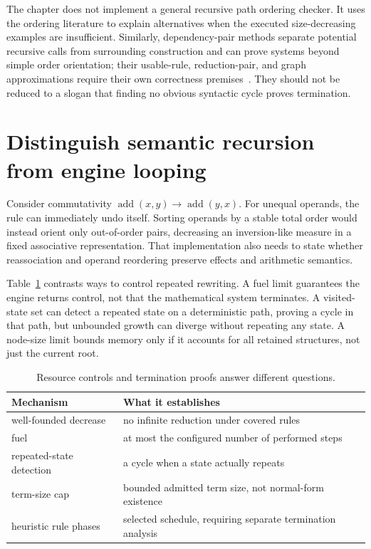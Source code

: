 The chapter does not implement a general recursive path ordering checker.
It uses the ordering literature to explain alternatives when the executed size-decreasing examples are insufficient.
Similarly, dependency-pair methods separate potential recursive calls from surrounding construction and can prove systems beyond simple order orientation; their usable-rule, reduction-pair, and graph approximations require their own correctness premises~\cite{ohlebusch-2002-rewriting}.
They should not be reduced to a slogan that finding no obvious syntactic cycle proves termination.

\section{Distinguish semantic recursion from engine looping}
\label{sec:ch83-engine}
Consider commutativity $\operatorname{add}(x,y)\to\operatorname{add}(y,x)$.
For unequal operands, the rule can immediately undo itself.
Sorting operands by a stable total order would instead orient only out-of-order pairs, decreasing an inversion-like measure in a fixed associative representation.
That implementation also needs to state whether reassociation and operand reordering preserve effects and arithmetic semantics.

Table~\ref{tab:ch83-loop} contrasts ways to control repeated rewriting.
A fuel limit guarantees the engine returns control, not that the mathematical system terminates.
A visited-state set can detect a repeated state on a deterministic path, proving a cycle in that path, but unbounded growth can diverge without repeating any state.
A node-size limit bounds memory only if it accounts for all retained structures, not just the current root.

\begin{table}[htbp]
\caption{Resource controls and termination proofs answer different questions.}
\label{tab:ch83-loop}
\centering
\begin{tabular}{ll}
\toprule
Mechanism & What it establishes \\
\midrule
well-founded decrease & no infinite reduction under covered rules \\
fuel & at most the configured number of performed steps \\
repeated-state detection & a cycle when a state actually repeats \\
term-size cap & bounded admitted term size, not normal-form existence \\
heuristic rule phases & selected schedule, requiring separate termination analysis \\
\bottomrule
\end{tabular}
\end{table}

